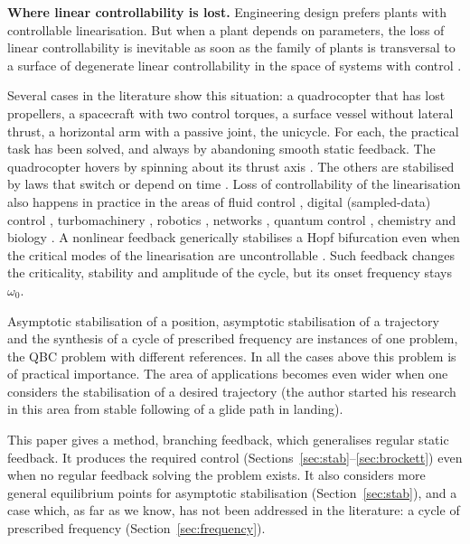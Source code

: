 \documentclass[11pt,reqno]{amsart}
\theoremstyle{plain}
\theoremstyle{definition}
\theoremstyle{remark}
\begin{document}
\medskip
\noindent\textbf{Where linear controllability is lost.}
Engineering design prefers plants with controllable linearisation. But when a plant depends on
parameters, the loss of linear controllability is inevitable as soon as the family of plants is transversal
to a surface of degenerate linear controllability in the space of systems with control \cite[\S4.11]{Shosh1990}.

Several cases in the literature show this situation: a quadrocopter that has lost propellers, a
spacecraft with two control torques, a surface vessel without lateral thrust, a horizontal arm with a
passive joint, the unicycle. For each, the practical task has been solved, and always by abandoning smooth
static feedback. The quadrocopter hovers by spinning about its thrust axis
\cite{MuellerDAndrea2014,MuellerDAndrea2016}. The others are stabilised by laws that switch or depend on
time \cite{BrewerTsiotras2022,Reyhanoglu1997,PanPengLvTian2025,DeLucaMattoneOriolo2000,dAndreaNovelCoronPerruquetti2020}. Loss of controllability of the linearisation
also happens in practice in the areas of fluid control \cite{CoronLissy2014}, digital (sampled-data) control
\cite{YangWangWang2024}, turbomachinery \cite{LiawAbed1996}, robotics \cite{Sampei2018}, networks \cite{JiangLai2019},
quantum control \cite{Bournissou2023}, chemistry \cite{LeBalch2019} and biology \cite{CorneliusKathMotter2013}. A nonlinear
feedback generically stabilises a Hopf bifurcation even when the critical modes of the linearisation are uncontrollable
\cite{AbedFu1986,HamziKangBarbot2004}. Such feedback changes the criticality, stability and amplitude of the cycle, but its
onset frequency stays $\omega_0$.

Asymptotic stabilisation of a position, asymptotic stabilisation of a trajectory and the synthesis of a cycle
of prescribed frequency are instances of one problem, the QBC problem with different
references. In all the cases above this problem is of practical importance.
The area of applications becomes even wider when one considers the stabilisation of a desired trajectory (the author
started his research in this area from stable following of a glide path in landing).

This paper gives a method, branching feedback, which generalises regular static feedback. It produces
the required control (Sections~\ref{sec:stab}--\ref{sec:brockett}) even when no regular feedback solving the
problem exists. It also considers more general equilibrium points for asymptotic
stabilisation (Section~\ref{sec:stab}), and a case which, as far as we know, has not been addressed in the literature: a cycle of
prescribed frequency (Section~\ref{sec:frequency}).
\end{document}
